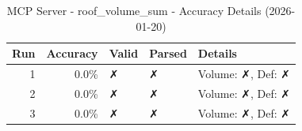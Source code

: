 \begin{table}[ht]
\centering
\small
\caption{MCP Server - roof\_volume\_sum - Accuracy Details (2026-01-20)}
\label{tab:mcp\_roof\_volume\_sum\_accuracy\_2026-01-20}
\begin{tabular}{r r l l p{6cm}}
\hline
Run & Accuracy & Valid & Parsed & Details \\
\hline
1 & 0.0\% & ✗ & ✗ & Volume: ✗, Def: ✗ \\
2 & 0.0\% & ✗ & ✗ & Volume: ✗, Def: ✗ \\
3 & 0.0\% & ✗ & ✗ & Volume: ✗, Def: ✗ \\
\hline
\end{tabular}
\end{table}
